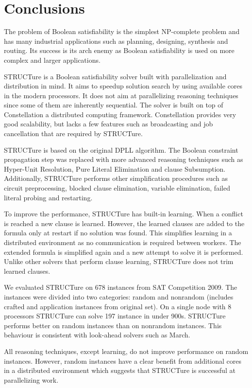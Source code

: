 \chapter{Conclusions}
\label{chap:conclusions}

The problem of Boolean satisfiability is the simplest NP-complete
problem and has many industrial applications such as planning,
designing, synthesis and routing. Its success is its arch enemy
as Boolean satisfiability is used on more complex and larger
applications.

STRUCTure is a Boolean satisfiability solver built with
parallelization and distribution in mind. It aims to speedup solution
search by using available cores in the modern processors. It does not
aim at parallelizing reasoning techniques since some of them are
inherently sequential. The solver is built on top of Constellation
a distributed computing framework. Constellation provides very good
scalability, but lacks a few features such as broadcasting and job
cancellation that are required by STRUCTure.

STRUCTure is based on the original DPLL algorithm. The Boolean
constraint propagation step was replaced with more advanced reasoning
techniques such as Hyper-Unit Resolution, Pure Literal Elimination
and clause Subsumption.  Additionally, STRUCTure performs other
simplification procedures such as circuit preprocessing, blocked
clause elimination, variable elimination, failed literal probing
and restarting.

To improve the performance, STRUCTure has built-in learning.  When a
conflict is reached a new clause is learned. However, the learned
clauses are added to the formula only at restart if no solution was
found. This simplifies learning in a distributed environment as no
communication is required between workers.  The extended formula is
simplified again and a new attempt to solve it is performed. Unlike
other solvers that perform clause learning, STRUCTure does not trim
learned clauses.

We evaluated STRUCTure on 678 instances from SAT Competition 2009.
The instances were divided into two categories: random and nonrandom
(includes crafted and application instances from original set).
On a single node with 8 processors STRUCTure can solve 197 instance
in under 900s.  STRUCTure performs better on random instances than
on nonrandom instances. This behaviour is consistent with look-ahead
solvers such as March.

All reasoning techniques, except learning, do not improve performance
on random instances. However, random instances have a clear benefit
from additional cores in a distributed environment which suggests
that STRUCTure is successful at parallelizing work.

